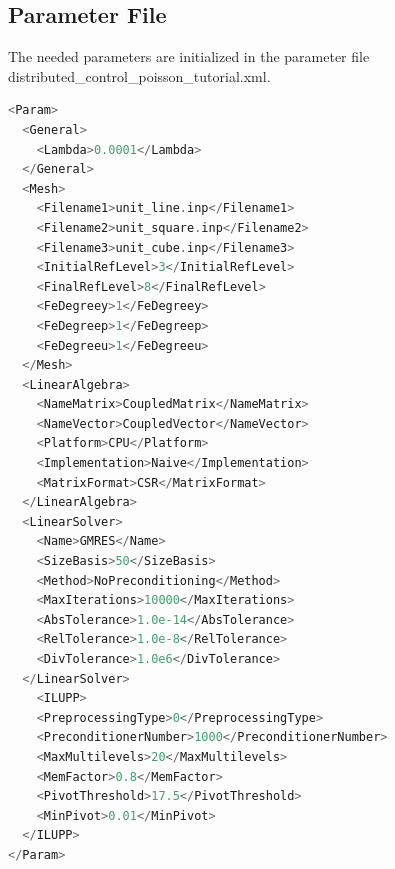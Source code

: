 \documentclass[a4paper, 11pt, twoside]{article}
\begin{document}
\subsection{Parameter File}\label{sectionparameter file}
The needed parameters are initialized in the parameter file distributed\_control\_poisson\_tutorial.xml.
\begin{lstlisting}[language=C++, basicstyle={\footnotesize, \ttfamily}, keywordstyle=\color{blue}, numbers=none, tabsize=4]
<Param>	
  <General>
    <Lambda>0.0001</Lambda>
  </General>
  <Mesh>
    <Filename1>unit_line.inp</Filename1>
    <Filename2>unit_square.inp</Filename2>
    <Filename3>unit_cube.inp</Filename3>
    <InitialRefLevel>3</InitialRefLevel>
    <FinalRefLevel>8</FinalRefLevel>
    <FeDegreey>1</FeDegreey>
    <FeDegreep>1</FeDegreep>
    <FeDegreeu>1</FeDegreeu>
  </Mesh>
  <LinearAlgebra>
    <NameMatrix>CoupledMatrix</NameMatrix>
    <NameVector>CoupledVector</NameVector>
    <Platform>CPU</Platform>
    <Implementation>Naive</Implementation>
    <MatrixFormat>CSR</MatrixFormat>
  </LinearAlgebra>
  <LinearSolver>
    <Name>GMRES</Name>
    <SizeBasis>50</SizeBasis>
    <Method>NoPreconditioning</Method>
    <MaxIterations>10000</MaxIterations>
    <AbsTolerance>1.0e-14</AbsTolerance>
    <RelTolerance>1.0e-8</RelTolerance>
    <DivTolerance>1.0e6</DivTolerance>
  </LinearSolver>
    <ILUPP>
    <PreprocessingType>0</PreprocessingType>
    <PreconditionerNumber>1000</PreconditionerNumber>
    <MaxMultilevels>20</MaxMultilevels>
    <MemFactor>0.8</MemFactor>
    <PivotThreshold>17.5</PivotThreshold>
    <MinPivot>0.01</MinPivot>
  </ILUPP>
</Param>
\end{lstlisting}
\end{document}
